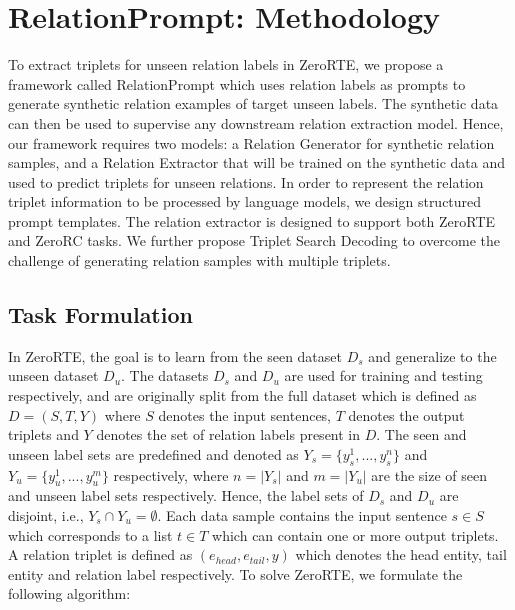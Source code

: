\documentclass[11pt]{article}
\newcommand{\flag}[1]{#1}
\begin{document}
\section{RelationPrompt: Methodology}
To extract triplets for unseen relation labels in ZeroRTE, we propose a framework called RelationPrompt which uses relation labels as prompts to generate synthetic relation examples of target unseen labels.
The synthetic data can then be used to supervise any downstream relation extraction model.
Hence, our framework requires two models: a Relation Generator for synthetic relation samples, and a Relation Extractor that will be trained on the synthetic data and used to predict triplets for unseen relations.
In order to represent the relation triplet information to be processed by language models, we design structured prompt templates.
The relation extractor is designed to support both ZeroRTE and ZeroRC tasks.
We further propose Triplet Search Decoding to overcome the challenge of generating relation samples with multiple triplets.




\subsection{Task Formulation}
\flag{
In ZeroRTE, the goal is to learn from the seen dataset $D_s$ and generalize to the unseen dataset $D_u$.
The datasets $D_s$ and $D_u$ are used for training and testing respectively, and are originally split from the full dataset which is defined as $D = (S, T, Y)$ where $S$ denotes the input sentences, $T$ denotes the output triplets and $Y$ denotes the set of relation labels present in $D$. 
The seen and unseen label sets are predefined and denoted as 
$Y_{s} = \{y_{s}^{1}, ..., y_{s}^{n}\}$
and
$Y_{u} = \{y_{u}^{1}, ..., y_{u}^{m}\}$
respectively, where 
$n = |Y_{s}|$
and
$m = |Y_{u}|$
are the size of seen and unseen label sets respectively.
Hence, the label sets of $D_s$ and $D_u$ are disjoint, i.e., $Y_{s} \cap Y_{u} = \emptyset$.
Each data sample contains the input sentence $s \in S$ which corresponds to a list $t \in T$ which can contain one or more output triplets.
A relation triplet is defined as 
$(e_{head}, e_{tail}, y)$ which denotes the head entity, tail entity and relation label respectively.
To solve ZeroRTE, we formulate the following algorithm:
}
\end{document}
